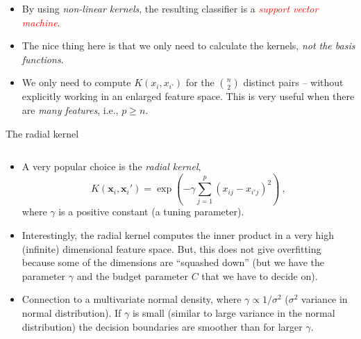 \documentclass[10pt,ignorenonframetext,]{beamer}
\providecommand{\tightlist}{%
  \setlength{\itemsep}{0pt}\setlength{\parskip}{0pt}}
\begin{document}
\begin{frame}

\begin{itemize}
\item
  By using \emph{non-linear kernels}, the resulting classifier is a
  \emph{\textcolor{red}{support vector machine}}.
\item
  The nice thing here is that we only need to calculate the kernels,
  \emph{not the basis functions}.
\item
  We only need to compute \(K(x_i,x_{i'})\) for the \({n \choose 2}\)
  distinct pairs -- without explicitly working in an enlarged feature
  space. This is very useful when there are \emph{many features}, i.e.,
  \(p\geq n\).
\end{itemize}

\end{frame}

\begin{frame}

\begin{block}{The radial kernel}

\(~\)

\begin{itemize}
\tightlist
\item
  A very popular choice is the \emph{radial kernel}, \[
  K({\boldsymbol x}_i,{\boldsymbol x}_i')=\exp(-\gamma \sum_{j=1}^p (x_{ij}-x_{i'j})^2) \ ,
  \] where \(\gamma\) is a positive constant (a tuning parameter).
\end{itemize}

\vspace{1mm}

\begin{itemize}
\tightlist
\item
  Interestingly, the radial kernel computes the inner product in a very
  high (infinite) dimensional feature space. But, this does not give
  overfitting because some of the dimensions are ``squashed down'' (but
  we have the parameter \(\gamma\) and the budget parameter \(C\) that
  we have to decide on).
\end{itemize}

\vspace{1mm}

\begin{itemize}
\tightlist
\item
  Connection to a multivariate normal density, where
  \(\gamma \propto 1/\sigma^2\) (\(\sigma^2\) variance in normal
  distribution). If \(\gamma\) is small (similar to large variance in
  the normal distribution) the decision boundaries are smoother than for
  larger \(\gamma\).
\end{itemize}

\end{block}

\end{frame}
\end{document}
